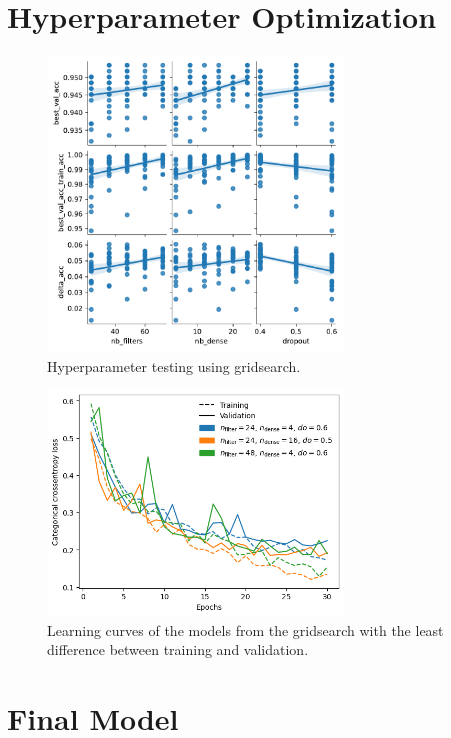 \section{Hyperparameter Optimization}
\label{sec:hyperparameter}



\begin{figure}[H]
    \centering
    \includegraphics[width=0.7\textwidth]{plots/pairplot.pdf}
    \caption{Hyperparameter testing using gridsearch.}
    \label{fig:gridsearch}
\end{figure}

\begin{figure}[H]
    \centering
    \includegraphics[width=0.7\textwidth]{plots/SmallestDelta_LearningCurves.png}
    \caption{Learning curves of the models from the gridsearch with the least difference between training and validation.}
    \label{fig:SmallestDelta_LearningCurves}
\end{figure}


\section{Final Model}
\label{sec:finalModel}

